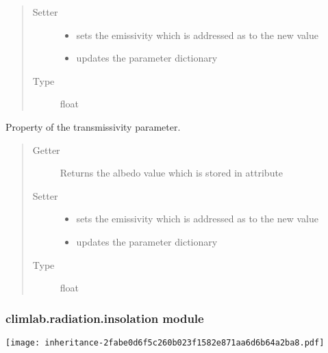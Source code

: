 \documentclass[a4paper,10pt,english]{sphinxmanual}
\begin{document}
\begin{fulllineitems}
\begin{fulllineitems}
\begin{quote}
\begin{description}
\item[{Setter}] \leavevmode\begin{itemize}
\item {} 
sets the emissivity which is addressed as 
to the new value

\item {} 
updates the parameter dictionary 

\end{itemize}

\item[{Type}] \leavevmode
float

\end{description}\end{quote}

\end{fulllineitems}


\begin{fulllineitems}
\label{api/climlab.radiation:climlab.radiation.Boltzmann.Boltzmann.tau}
Property of the transmissivity parameter.
\begin{quote}\begin{description}
\item[{Getter}] \leavevmode
Returns the albedo value which is stored in attribute 

\item[{Setter}] \leavevmode\begin{itemize}
\item {} 
sets the emissivity which is addressed as 
to the new value

\item {} 
updates the parameter dictionary 

\end{itemize}

\item[{Type}] \leavevmode
float

\end{description}\end{quote}

\end{fulllineitems}


\end{fulllineitems}



\subsubsection{climlab.radiation.insolation module}
\label{api/climlab.radiation:climlab-radiation-insolation-module}
\texttt{[image: inheritance-2fabe0d6f5c260b023f1582e871aa6d6b64a2ba8.pdf]}
\label{api/climlab.radiation:module-climlab.radiation.insolation}
\end{document}
